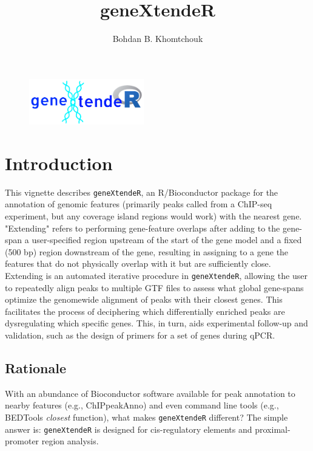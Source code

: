 \documentclass[12pt]{article}
\title{geneXtendeR}
\author{Bohdan B. Khomtchouk}
\begin{document}


\maketitle

\begin{figure}[H]
\centering
\includegraphics[width=50mm,scale=0.8]{figures/geneXtendeRlogo.png}
\end{figure}

\section*{Introduction}

This vignette describes \texttt{geneXtendeR}, an R/Bioconductor package for the annotation of genomic features (primarily peaks called from a ChIP-seq experiment, but any coverage island regions would work) with the nearest gene. "Extending" refers to performing gene-feature overlaps after adding to the gene-span a user-specified region upstream of the start of the gene model and a fixed (500 bp) region downstream of the gene, resulting in assigning to a gene the features that do not physically overlap with it but are sufficiently close.  Extending is an automated iterative procedure in \texttt{geneXtendeR}, allowing the user to repeatedly align peaks to multiple GTF files to assess what global gene-spans optimize the genomewide alignment of peaks with their closest genes.  This facilitates the process of deciphering which differentially enriched peaks are dysregulating which specific genes.  This, in turn, aids experimental follow-up and validation, such as the design of primers for a set of genes during qPCR.  

\subsection*{Rationale}

With an abundance of Bioconductor software available for peak annotation to nearby features (e.g., ChIPpeakAnno) and even command line tools (e.g., BEDTools \emph{closest} function), what makes \texttt{geneXtendeR} different?  The simple answer is: \texttt{geneXtendeR} is designed for cis-regulatory elements and proximal-promoter region analysis.  
\end{document}
